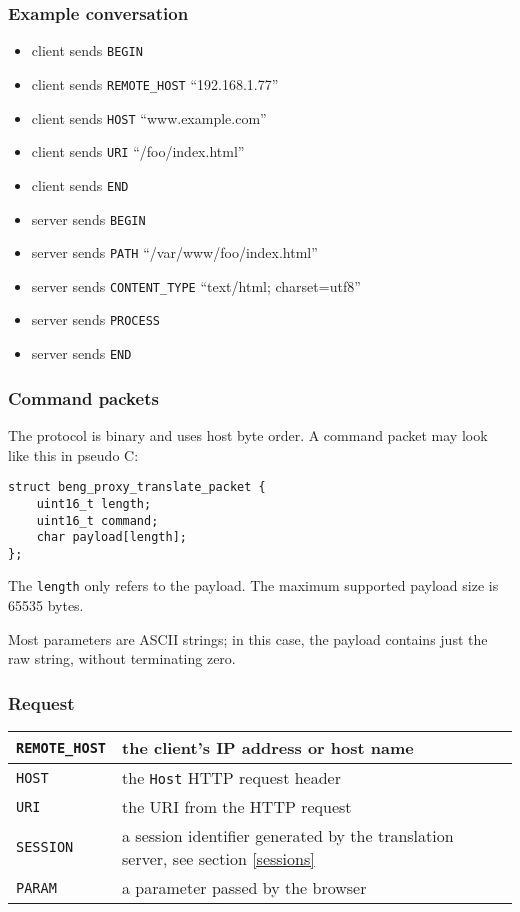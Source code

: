 \documentclass[a4paper,12pt]{article}
\begin{document}
\subsubsection{Example conversation}

\begin{itemize}
\item client sends \texttt{BEGIN}
\item client sends \texttt{REMOTE\_HOST} ``192.168.1.77''
\item client sends \texttt{HOST} ``www.example.com''
\item client sends \texttt{URI} ``/foo/index.html''
\item client sends \texttt{END}
\item server sends \texttt{BEGIN}
\item server sends \texttt{PATH} ``/var/www/foo/index.html''
\item server sends \texttt{CONTENT\_TYPE} ``text/html; charset=utf8''
\item server sends \texttt{PROCESS}
\item server sends \texttt{END}
\end{itemize}

\subsubsection{Command packets}

The protocol is binary and uses host byte order.  A command packet may
look like this in pseudo C:

\begin{verbatim}
struct beng_proxy_translate_packet {
    uint16_t length;
    uint16_t command;
    char payload[length];
};
\end{verbatim}

The \texttt{length} only refers to the payload.  The maximum supported
payload size is 65535 bytes.

Most parameters are ASCII strings; in this case, the payload contains
just the raw string, without terminating zero.

\subsubsection{Request}

\begin{tabular}{|l|p{10cm}|}
\hline
\texttt{REMOTE\_HOST} & the client's IP address or host name \\
\hline
\texttt{HOST} & the \texttt{Host} HTTP request header \\
\hline
\texttt{URI} & the URI from the HTTP request \\
\hline
\texttt{SESSION} & a session identifier generated by the translation
server, see section \ref{sessions} \\
\hline
\texttt{PARAM} & a parameter passed by the browser \\
\hline
\end{tabular}
\end{document}
